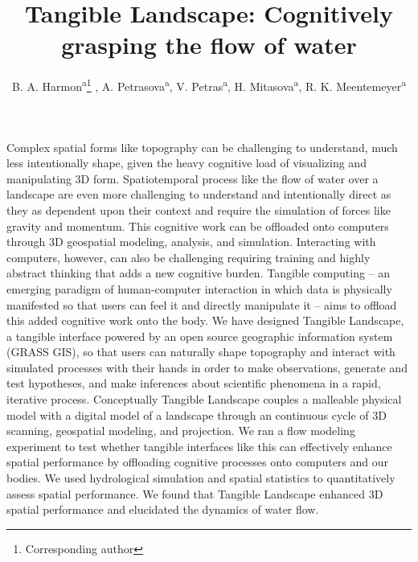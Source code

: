 \documentclass{isprs}
\begin{document}
\title{Tangible Landscape: Cognitively grasping the flow of water}

\author{
 B. A. Harmon\textsuperscript{a}\thanks{Corresponding author}
 , A. Petrasova\textsuperscript{a}, V. Petras\textsuperscript{a}, H. Mitasova\textsuperscript{a}, R. K. Meentemeyer\textsuperscript{a}}

\address
{
	\textsuperscript{a }Center for Geospatial Analytics, North Carolina State University - (baharmon, akratoc, vpetras, hmitaso, rkmeente)@ncsu.edu\\
}

\commission{}{} %
\workinggroup{} %
\icwg{}   %

\abstract
{
Complex spatial forms like topography can be challenging to understand, much less intentionally shape, given the heavy cognitive load of visualizing and manipulating 3D form. Spatiotemporal process like the flow of water over a landscape are even more challenging to understand and intentionally direct as they as dependent upon their context and require the simulation of forces like gravity and momentum. This cognitive work can be offloaded onto computers through 3D geospatial modeling, analysis, and simulation.
Interacting with computers, however, can also be challenging requiring training and highly abstract thinking that adds a new cognitive burden. Tangible computing -- an emerging paradigm of human-computer interaction in which data is physically manifested so that users can feel it and directly manipulate it -- aims to offload this added cognitive work onto the body. We have designed Tangible Landscape, a tangible interface powered by an open source geographic information system (GRASS GIS), so that users can naturally shape topography and interact with simulated processes with their hands in order to make observations, generate and test hypotheses, and make inferences about scientific phenomena in a rapid, iterative process. Conceptually Tangible Landscape couples a malleable physical model with a digital model of a landscape through an continuous cycle of 3D scanning, geospatial modeling, and projection. 
We ran a flow modeling experiment to test whether tangible interfaces like this can effectively enhance spatial performance by offloading cognitive processes onto computers and our bodies. We used hydrological simulation and spatial statistics to quantitatively assess spatial performance. We found that Tangible Landscape enhanced 3D spatial performance and elucidated the dynamics of water flow. 
}
\end{document}
